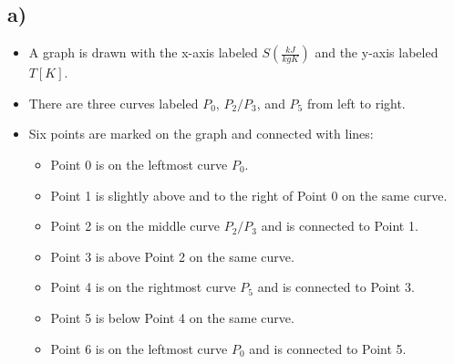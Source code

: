 

\subsection*{a)}

\begin{itemize}
    \item A graph is drawn with the x-axis labeled \( S \left( \frac{kJ}{kgK} \right) \) and the y-axis labeled \( T \left[ K \right] \).
    \item There are three curves labeled \( P_0 \), \( P_2/P_3 \), and \( P_5 \) from left to right.
    \item Six points are marked on the graph and connected with lines:
    \begin{itemize}
        \item Point 0 is on the leftmost curve \( P_0 \).
        \item Point 1 is slightly above and to the right of Point 0 on the same curve.
        \item Point 2 is on the middle curve \( P_2/P_3 \) and is connected to Point 1.
        \item Point 3 is above Point 2 on the same curve.
        \item Point 4 is on the rightmost curve \( P_5 \) and is connected to Point 3.
        \item Point 5 is below Point 4 on the same curve.
        \item Point 6 is on the leftmost curve \( P_0 \) and is connected to Point 5.
    \end{itemize}
\end{itemize}